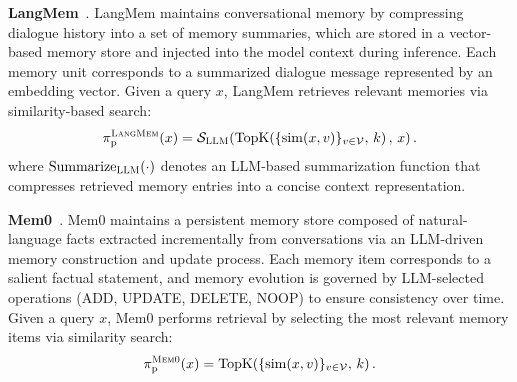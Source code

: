 


\textbf{LangMem}~\cite{langmem2025}.
LangMem maintains conversational memory by compressing dialogue history into a set of memory summaries, which are stored in a vector-based memory store and injected into the model context during inference.
Each memory unit corresponds to a summarized dialogue message represented by an embedding vector.
Given a query $x$, LangMem retrieves relevant memories via similarity-based search:
\begin{equation}
\pi_{\mathrm p}^{\textsc{LangMem}}(x)
=
\mathcal{S}_{\textsc{LLM}}
\!\left(
\mathrm{TopK}\!\left(\{\mathrm{sim}(x,v)\}_{v\in\mathcal{V}},\,k\right),
\,x
\right).
\end{equation}
where $\mathrm{Summarize}_{\textsc{LLM}}(\cdot)$ denotes an LLM-based
summarization function that compresses retrieved memory entries into
a concise context representation.

\textbf{Mem0}~\cite{DBLP:journals/corr/abs-2504-19413}.
Mem0 maintains a persistent memory store composed of natural-language facts extracted incrementally from conversations via an LLM-driven memory construction and update process.
Each memory item corresponds to a salient factual statement, and memory evolution is governed by LLM-selected operations (ADD, UPDATE, DELETE, NOOP) to ensure consistency over time.
Given a query $x$, Mem0 performs retrieval by selecting the most relevant memory items via similarity search:
\begin{equation}
\pi_{\mathrm p}^{\textsc{Mem0}}(x) = \mathrm{TopK}\!\left(\{\mathrm{sim}(x,v)\}_{v \in \mathcal{V}},\, k\right).
\end{equation}



